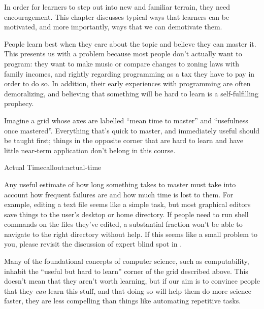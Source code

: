 
In order for learners to step out into new and familiar terrain, they
need encouragement. This chapter discusses typical ways that learners
can be motivated, and more importantly, ways that we can demotivate
them.

People learn best when they care about the topic and believe they can
master it. This presents us with a problem because most people don't
actually want to program: they want to make music or compare changes
to zoning laws with family incomes, and rightly regarding programming
as a tax they have to pay in order to do so. In addition, their early
experiences with programming are often demoralizing, and believing
that something will be hard to learn is a self-fulfilling prophecy.

Imagine a grid whose axes are labelled ``mean time to master'' and
``usefulness once mastered''. Everything that's quick to master, and
immediately useful should be taught first; things in the opposite corner
that are hard to learn and have little near-term application don't
belong in this course.


\begin{callout}{Actual Time}{callout:actual-time}

Any useful estimate of how long something takes to master must take
into account how frequent failures are and how much time is lost to
them. For example, editing a text file seems like a simple task, but
most graphical editors save things to the user's desktop or home
directory.  If people need to run shell commands on the files they've
edited, a substantial fraction won't be able to navigate to the right
directory without help. If this seems like a small problem to you,
please revisit the discussion of expert blind spot in
.

\end{callout}

Many of the foundational concepts of computer science, such as
computability, inhabit the ``useful but hard to learn'' corner of the
grid described above. This doesn't mean that they aren't worth
learning, but if our aim is to convince people that they \emph{can}
learn this stuff, and that doing so will help them do more science
faster, they are less compelling than things like automating
repetitive tasks.

